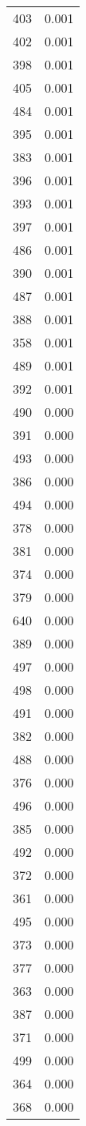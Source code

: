 \begin{table}
\begin{tabular}{lr}
403 & 0.001 \\
402 & 0.001 \\
398 & 0.001 \\
405 & 0.001 \\
484 & 0.001 \\
395 & 0.001 \\
383 & 0.001 \\
396 & 0.001 \\
393 & 0.001 \\
397 & 0.001 \\
486 & 0.001 \\
390 & 0.001 \\
487 & 0.001 \\
388 & 0.001 \\
358 & 0.001 \\
489 & 0.001 \\
392 & 0.001 \\
490 & 0.000 \\
391 & 0.000 \\
493 & 0.000 \\
386 & 0.000 \\
494 & 0.000 \\
378 & 0.000 \\
381 & 0.000 \\
374 & 0.000 \\
379 & 0.000 \\
640 & 0.000 \\
389 & 0.000 \\
497 & 0.000 \\
498 & 0.000 \\
491 & 0.000 \\
382 & 0.000 \\
488 & 0.000 \\
376 & 0.000 \\
496 & 0.000 \\
385 & 0.000 \\
492 & 0.000 \\
372 & 0.000 \\
361 & 0.000 \\
495 & 0.000 \\
373 & 0.000 \\
377 & 0.000 \\
363 & 0.000 \\
387 & 0.000 \\
371 & 0.000 \\
499 & 0.000 \\
364 & 0.000 \\
368 & 0.000 \\

\end{tabular}
\end{table}
